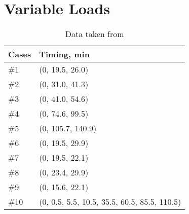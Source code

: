 \chapter{Variable Loads}\label{cp:VL}
\begin{table}[]
\centering
\begin{tabular}{|l|l|}
\hline
Cases & Timing, min \\ \hline
\rowcolor[HTML]{EFEFEF} 
\#1 & (0, 19.5, 26.0) \\ \hline
\#2 & (0, 31.0, 41.3) \\ \hline
\rowcolor[HTML]{EFEFEF} 
\#3 & (0, 41.0, 54.6) \\ \hline
\#4 & (0, 74.6, 99.5) \\ \hline
\rowcolor[HTML]{EFEFEF} 
\#5 & (0, 105.7, 140.9) \\ \hline
\#6 & (0, 19.5, 29.9) \\ \hline
\rowcolor[HTML]{EFEFEF} 
\#7 & (0, 19.5, 22.1) \\ \hline
\#8 & (0, 23.4, 29.9) \\ \hline
\rowcolor[HTML]{EFEFEF} 
\#9 & (0, 15.6, 22.1) \\ \hline
\#10 & (0, 0.5, 5.5, 10.5, 35.5, 60.5, 85.5, 110.5) \\ \hline
\end{tabular}
\caption{Data taken from \cite{battery_model}}
\label{table:variable_loads_list}
\end{table}